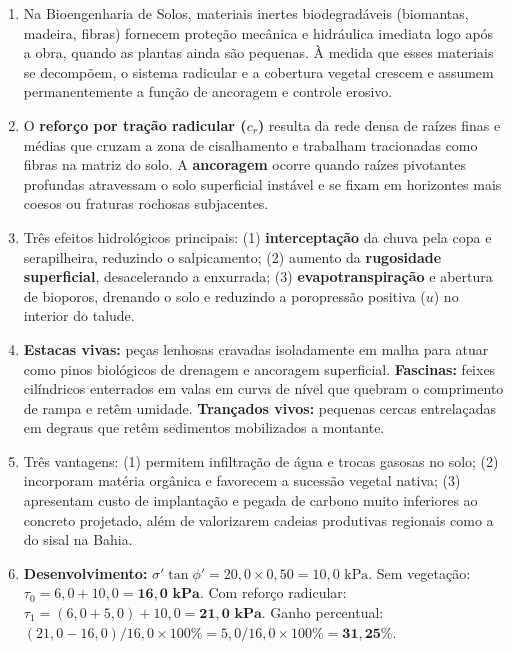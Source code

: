 \clearpage
{}

\begin{boxGabarito}
\begin{enumerate}[leftmargin=1.6em, itemsep=4pt]
  \item Na Bioengenharia de Solos, materiais inertes biodegradáveis (biomantas, madeira, fibras) fornecem proteção mecânica e hidráulica imediata logo após a obra, quando as plantas ainda são pequenas. À medida que esses materiais se decompõem, o sistema radicular e a cobertura vegetal crescem e assumem permanentemente a função de ancoragem e controle erosivo.
  \item O \textbf{reforço por tração radicular ($c_r$)} resulta da rede densa de raízes finas e médias que cruzam a zona de cisalhamento e trabalham tracionadas como fibras na matriz do solo. A \textbf{ancoragem} ocorre quando raízes pivotantes profundas atravessam o solo superficial instável e se fixam em horizontes mais coesos ou fraturas rochosas subjacentes.
  \item Três efeitos hidrológicos principais: (1) \textbf{interceptação} da chuva pela copa e serapilheira, reduzindo o salpicamento; (2) aumento da \textbf{rugosidade superficial}, desacelerando a enxurrada; (3) \textbf{evapotranspiração} e abertura de bioporos, drenando o solo e reduzindo a poropressão positiva ($u$) no interior do talude.
  \item \textbf{Estacas vivas:} peças lenhosas cravadas isoladamente em malha para atuar como pinos biológicos de drenagem e ancoragem superficial. \textbf{Fascinas:} feixes cilíndricos enterrados em valas em curva de nível que quebram o comprimento de rampa e retêm umidade. \textbf{Trançados vivos:} pequenas cercas entrelaçadas em degraus que retêm sedimentos mobilizados a montante.
  \item Três vantagens: (1) permitem infiltração de água e trocas gasosas no solo; (2) incorporam matéria orgânica e favorecem a sucessão vegetal nativa; (3) apresentam custo de implantação e pegada de carbono muito inferiores ao concreto projetado, além de valorizarem cadeias produtivas regionais como a do sisal na Bahia.
  \item \textbf{Desenvolvimento:}
  $\sigma'\tan\phi' = 20{,}0 \times 0{,}50 = 10{,}0\text{ kPa}$.
  Sem vegetação: $\tau_0 = 6{,}0 + 10{,}0 = \mathbf{16{,}0\text{ kPa}}$.
  Com reforço radicular: $\tau_1 = (6{,}0 + 5{,}0) + 10{,}0 = \mathbf{21{,}0\text{ kPa}}$.
  Ganho percentual: $(21{,}0 - 16{,}0)/16{,}0 \times 100\% = 5{,}0/16{,}0 \times 100\% = \mathbf{31{,}25\%}$.

\end{enumerate}
\end{boxGabarito}
